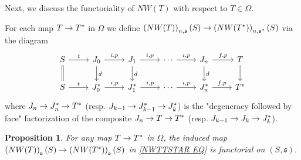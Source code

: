 \documentclass[a4paper,10pt
,draft
]{article}%
\numberwithin{equation}{section}
\numberwithin{figure}{section}
\newtheorem{proposition}[equation]{Proposition}%
\theoremstyle{definition} %
\newcommand{\1}{\ensuremath{\mathbbm 1}}%
\begin{document}
Next, we discuss the functoriality of
$NW(T)$ with respect to $T \in \Omega$.

For each map $T \to T^{\**}$ in $\Omega$
we define
$\left(NW(T)\right)_{n,\mathfrak{s}}(S)
	\to 
\left(NW(T^{\**})\right)_{n,\mathfrak{s}^{\**}}(S)$
via the diagram
\begin{equation}\label{NWTTSTAR EQ}
\begin{tikzcd}
	S \ar{r}{t} \ar[equal]{d}
&
	J_0 \ar{r}{i,p} \ar{d}{d}
&
	J_1 \ar{r}{i,p} \ar{d}{d}
&
	\cdots \ar{r}{i,p}
&
	J_n \ar{r}{f,p} \ar{d}{d}
&
	T \ar{d}
\\
	S \ar{r}{t} 
&
	J^{\**}_0 \ar{r}{i,p}
&
	J^{\**}_1 \ar{r}{i,p}
&
	\cdots \ar{r}{i,p}
&
	J^{\**}_n \ar{r}{f,p}
&
	T^{\**}
\end{tikzcd}
\end{equation}
where
$J_n \to J^{\**}_n \to T^{\**}$
(resp. 
$J_{k-1} \to J^{\**}_{k-1} \to J^{\**}_k$)
is the "degeneracy followed by face"
factorization of the composite
$J_n \to T \to T^{\**}$
(resp.
$J_{k-1} \to J_{k} \to J^{\**}_k$).




\begin{proposition}
	For any map $T \to T^{\**}$ in $\Omega$, the induced map
	$\left(NW(T)\right)_{\mathfrak{s}}(S)
	\to 
	\left(NW(T^{\**})\right)_{\mathfrak{s}}(S)$
	in 
	\eqref{NWTTSTAR EQ}
	is functorial on $(S,\mathfrak{s})$.
\end{proposition}
\end{document}
